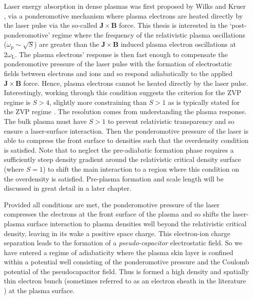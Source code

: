 Laser energy absorption in dense plasmas was first proposed by Wilks and Kruer \cite{wilksAbsorptionUltraIntenseLaser1992}, via a ponderomotive mechanism where plasma electrons are heated directly by the laser pulse via the so-called $\mathbf{J}\times \mathbf{B}$ force. This thesis is interested in the `post-ponderomotive' regime where the frequency of the relativistic plasma oscillations ($\omega_\mathrm{p} \sim \sqrt{S}$) are greater than the $\mathbf{J}\times \mathbf{B}$ induced plasma electron oscillations at $2\omega_\mathrm{L}$. The plasma electrons' response is then fast enough to compensate the ponderomotive pressure of the laser pulse with the formation of electrostatic fields between electrons and ions and so respond adiabatically to the applied $\mathbf{J}\times \mathbf{B}$ force. Hence, plasma electrons cannot be heated directly by the laser pulse. Interestingly, working through this condition suggests the criterion for the \ac{ZVP} regime is $S > 4$, slightly more constraining than $S>1$ as is typically stated for the \ac{ZVP} regime \cite{savinModellingLaserPlasmaInteractions2019}. The resolution comes from understanding the plasma response. The bulk plasma must have $S>1$ to prevent relativistic transparency and so ensure a laser-surface interaction. Then the ponderomotive pressure of the laser is able to compress the front surface to densities such that the overdensity condition is satisfied. Note that to neglect the pre-adiabatic formation phase requires a sufficiently steep density gradient around the relativistic critical density surface (where $S=1$) to shift the main interaction to a region where this condition on the overdensity is satisfied. Pre-plasma formation and scale length will be discussed in great detail in a later chapter.

Provided all conditions are met, the ponderomotive pressure of the laser compresses the electrons at the front surface of the plasma and so shifts the laser-plasma surface interaction to plasma densities well beyond the relativistic critical density, leaving in its wake a positive space charge. This electron-ion charge separation leads to the formation of a \textit{pseudo-capacitor} electrostatic field. So we have entered a regime of adiabaticity where the plasma skin layer is confined within a potential well consisting of the ponderomotive pressure and the Coulomb potential of the pseudocapacitor field. Thus is formed a high density and spatially thin electron bunch (sometimes referred to as an electron sheath in the literature \cite{gonoskovUltrarelativisticNanoplasmonicsRoute2011}) at the plasma surface.

